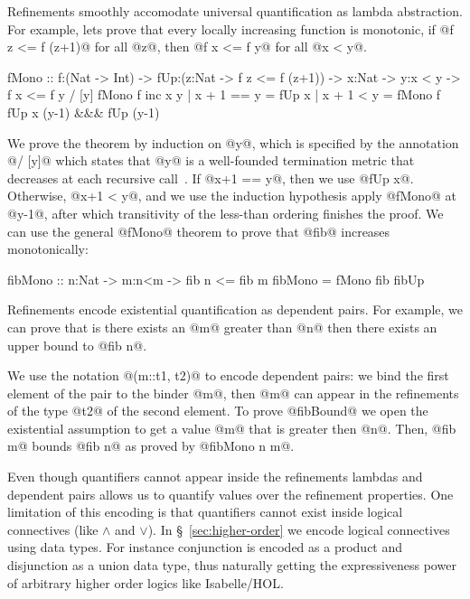 %
Refinements smoothly accomodate universal quantification as lambda abstraction.
%
For example, lets prove that every locally increasing
function is monotonic, \ie
if @f z <= f (z+1)@ for all @z@,
then @f x <= f y@ for all @x < y@.
%
\begin{mcode}
  fMono :: f:(Nat -> Int)
        -> fUp:(z:Nat -> {f z <= f (z+1)})
        -> x:Nat
        -> y:{x < y}
        -> {f x <= f y} / [y]
  fMono f inc x y
    | x + 1 == y = fUp x
    | x + 1 < y  = fMono f fUp x (y-1) &&& fUp (y-1)
\end{mcode}
%
We prove the theorem by induction
on @y@, which is specified by the
annotation @/ [y]@ which states
that @y@ is a well-founded
termination metric that decreases
at each recursive call~\citep{Vazou14}.
%
%
If @x+1 == y@, then we use @fUp x@.
%
Otherwise, @x+1 < y@, and we use
the induction hypothesis \ie apply
@fMono@ at @y-1@, after which
transitivity of the less-than
ordering finishes the proof.
%
We can use the general @fMono@
theorem to prove that @fib@
increases monotonically:
%
\begin{code}
  fibMono :: n:Nat -> m:{n<m} -> {fib n <= fib m}
  fibMono = fMono fib fibUp
\end{code}

Refinements encode existential quantification as dependent pairs.
%
For example, we can prove that is there exists an @m@ greater than @n@
then there exists an upper bound to @fib n@.

\begin{mcode}
  fibBound :: n:Nat -> (m::Int, {n < m}) -> (m'::Int, {fib n <= m' }) @-}
  fibBound n (m, pf) = (fib m, fibMono n m)
\end{mcode}
We use the notation @(m::t1, t2)@ to encode dependent pairs:
we bind the first element of the pair to the binder @m@,
then @m@ can appear in the refinements of the type @t2@ of the
second element.
%
To prove @fibBound@ we open the existential assumption to get a value
@m@ that is greater then @n@.
Then, @fib m@ bounds @fib n@ as proved by @fibMono n m@.

Even though quantifiers cannot appear inside the refinements
lambdas and dependent pairs allows us to quantify values over
the refinement properties.
%
One limitation of this encoding is that quantifiers cannot
exist inside logical connectives (like $\land$ and $\lor$).
%
In \S~\ref{sec:higher-order} we encode logical connectives using
data types.
For instance conjunction is encoded as a product and
disjunction as a union data type, thus naturally getting the
expressiveness power of arbitrary higher order logics like
Isabelle/HOL.


